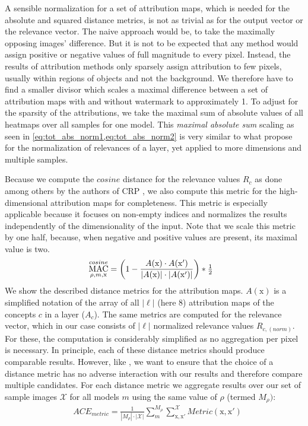 A sensible normalization for a set of attribution maps, which is needed for the absolute and squared distance metrics, is not as trivial as for the output vector or the relevance vector. The naive approach would be, to take the maximally opposing images' difference. But it is not to be expected that any method would assign positive or negative values of full magnitude to every pixel. Instead, the results of attribution methods only sparsely assign attribution to few pixels, usually within regions of objects and not the background. 
We therefore have to find a smaller divisor which scales a maximal difference between a set of attribution maps with and without watermark to approximately 1.
To adjust for the sparsity of the attributions, we take the maximal sum of absolute values of all heatmaps over all samples for one model. This \textit{maximal absolute sum} scaling as seen in \cref{eq:tot_abs_norm1,eq:tot_abs_norm2} is very similar to what \citet{Achtibat2022} propose for the normalization of relevances of a layer, yet applied to more dimensions and multiple samples.

Because we compute the $cosine$ distance for the relevance values $R_c$ as done among others by the authors of CRP \citep{Achtibat2023}, we also compute this metric for the high-dimensional attribution maps for completeness. This metric is especially applicable because it focuses on non-empty indices and normalizes the results independently of the dimensionality of the input. Note that we scale this metric by one half, because, when negative and positive values are present, its maximal value is two.
\begin{align}
\displaystyle 
& \operatorname*{MAC}_{\rho, m,\mathrm{x}}^{cosine} = \left( 1- 
\frac{A(\mathrm{x}) \cdot A(\mathrm{x'}) }{|A(\mathrm{x})|\cdot |A(\mathrm{x'})|}\right) * \tfrac{1}{2} &
\end{align}
We show the described distance metrics for the attribution maps. $A(\mathrm{x})$ is a simplified notation of the array of all $|\ell|$ (here 8) attribution maps of the concepts $c$ in a layer ($A_c$). The same metrics are computed for the relevance vector, which in our case consists of $|\ell|$ normalized relevance values $R_{c,(norm)}$. For these, the computation is considerably simplified as no aggregation per pixel is necessary. In principle, each of these distance metrics should produce comparable results. However, like \citet{Karimi2023}, we want to ensure that the choice of a distance metric has no adverse interaction with our results and therefore compare multiple candidates. 
For each distance metric we aggregate results over our set of sample images $\mathcal{X}$ for all models $m$ using the same value of $\rho$ (termed $M_{\rho})$:
\begin{align}\label{eq:ace_metric}
& ACE_{metric} = \frac{1}{|M_\rho|\cdot |\mathcal{X}| }\sum_{m}^{M_{\rho}} \sum_{\mathrm{x,x'}}^{\mathcal{X}} Metric(\mathrm{x,x'})
\end{align}

